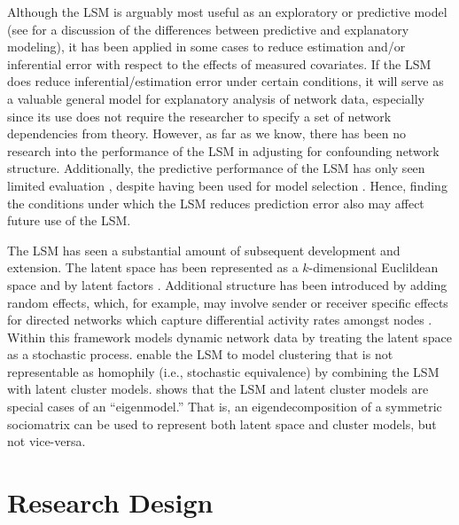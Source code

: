 \documentclass[11pt]{article}
\begin{document}

Although the LSM is arguably most useful as an exploratory or predictive model (see \citet{shmueli2010explain} for a discussion of the differences between predictive and explanatory modeling), it has been applied in some cases to reduce estimation and/or inferential error with respect to the effects of measured covariates. If the LSM does reduce inferential/estimation error under certain conditions, it will serve as a valuable general model for explanatory analysis of network data, especially since its use does not require the researcher to specify a set of network dependencies from theory. However, as far as we know, there has been no research into the performance of the LSM in adjusting for confounding network structure. Additionally, the predictive performance of the LSM has only seen limited evaluation \citep{hoff2002latent}, despite having been used for model selection \citep{ward2013gravity, fletcher2011social, fletcher2013network, chiu2011unifying}. Hence, finding the conditions under which the LSM reduces prediction error also may affect future use of the LSM.

The LSM has seen a substantial amount of subsequent development and extension. The latent space has been represented as a $k$-dimensional Euclildean space and by latent factors \citep{hoff2002latent, hoff2009multiplicative}. Additional structure has been introduced by adding random effects, which, for example, may involve sender or receiver specific effects for directed networks which capture differential activity rates amongst nodes \citep{hoff2003random}. Within this framework \cite{westveld2011mixed} models dynamic network data by treating the latent space as a stochastic process. \cite{handcock2007model} enable the LSM to model clustering that is not representable as homophily (i.e., stochastic equivalence) by combining the LSM with latent cluster models. \cite{hoff2008modeling} shows that the LSM and latent cluster models are special cases of an ``eigenmodel.'' That is, an eigendecomposition of a symmetric sociomatrix can be used to represent both latent space and cluster models, but not vice-versa.

\section{Research Design}
\end{document}
